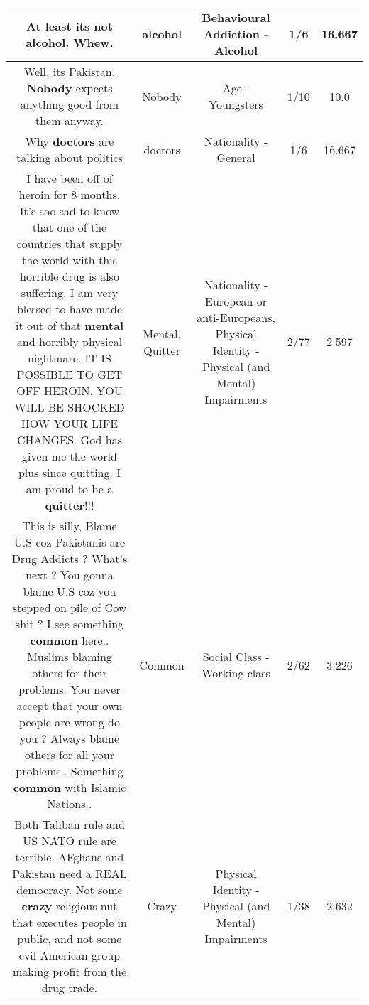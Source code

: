 \documentclass[11pt]{article}
\newlength\mylength
\begin{document}
\begin{center}
\begin{longtable}{|C{.65\mylength}|C{.30\mylength}|C{.12\mylength}|C{.12\mylength}|C{.12\mylength}|}
  \small At least its not \textbf{alcohol}.  Whew.\normalsize   & alcohol & Behavioural Addiction - Alcohol & 1/6 & 16.667 \\  \hline
  \small Well, its Pakistan. \textbf{Nobody} expects anything good from them anyway.\normalsize   & Nobody & Age - Youngsters & 1/10 & 10.0 \\  \hline
  \small Why \textbf{doctors} are talking about politics\normalsize   & doctors & Nationality - General & 1/6 & 16.667 \\  \hline
  \small I have been off of heroin for 8 months. It's soo sad to know that one of the countries that supply the world with this horrible drug is also suffering. I am very blessed to have made it out of that \textbf{mental} and  horribly physical nightmare. IT IS POSSIBLE TO GET OFF HEROIN. YOU WILL BE SHOCKED HOW YOUR LIFE CHANGES. God has given me the world plus since quitting. I am proud to be a \textbf{quitter}!!!\normalsize   & Mental, Quitter & Nationality - European or anti-Europeans, Physical Identity - Physical (and Mental) Impairments & 2/77 & 2.597 \\  \hline
  \small This is silly, Blame U.S coz Pakistanis are Drug Addicts ? What's next ? You gonna blame U.S coz you stepped on pile of Cow shit ? I see something \textbf{common} here.. Muslims blaming others for their problems. You never accept that your own people are wrong do you ? Always blame others for all your problems.. Something \textbf{common} with Islamic Nations..\normalsize   & Common & Social Class - Working class & 2/62 & 3.226 \\  \hline
  \small Both Taliban rule and US NATO rule are terrible. AFghans and Pakistan need a REAL democracy. Not some \textbf{crazy} religious nut that executes people in public, and not some evil American group making profit from the drug trade.\normalsize   & Crazy & Physical Identity - Physical (and Mental) Impairments & 1/38 & 2.632 \\  \hline

\end{longtable}
\end{center}
\end{document}
